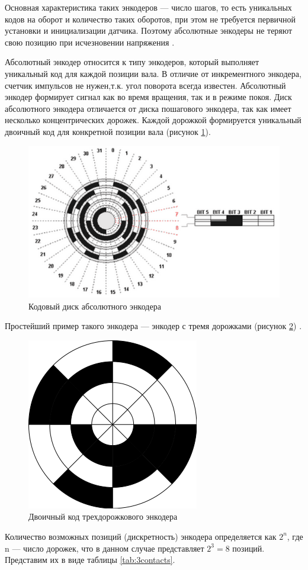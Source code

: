 Основная характеристика таких энкодеров --- число шагов, то есть уникальных кодов на оборот и количество таких оборотов, при этом не требуется первичной установки и инициализации датчика. Поэтому абсолютные энкодеры не теряют свою позицию при исчезновении напряжения \cite{epromauto:enc}.

Абсолютный энкодер относится к типу энкодеров, который выполняет уникальный код для каждой позиции вала. В отличие от инкрементного энкодера, счетчик импульсов не нужен,т.к. угол поворота всегда известен. Абсолютный энкодер формирует сигнал как во время вращения, так и в режиме покоя. Диск абсолютного энкодера отличается от диска пошагового энкодера, так как имеет несколько концентрических дорожек. Каждой дорожкой формируется уникальный двоичный код для конкретной позиции вала (рисунок \ref{fig:code}).

\begin{figure}[ht]
    \includegraphics[width=.7\linewidth]{Figures/code.png}
    \caption{Кодовый диск абсолютного энкодера}
    \label{fig:code}
\end{figure}

Простейший пример такого энкодера --- энкодер с тремя дорожками (рисунок \ref{fig:3contacts}) \cite{wiki:enrotary}.

\begin{figure}[ht]
    \includegraphics[width=0.3\linewidth]{Figures/3contacts.png}
    \caption{Двоичный код трехдорожкового энкодера\label{fig:3contacts}}
\end{figure}

Количество возможных позиций (дискретность) энкодера определяется как $2^n$, где n --- число дорожек, что в данном случае представляет $2^3 = 8$ позиций. Представим их в виде таблицы \ref{tab:3contacts}.

